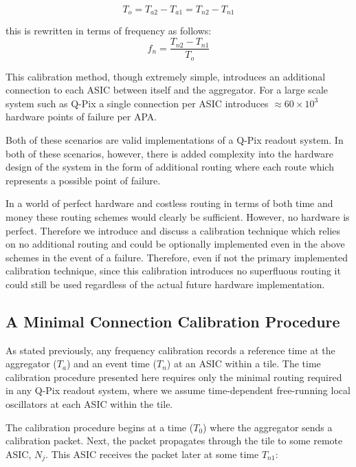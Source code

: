 \begin{equation}
  T_{o} = T_{a2} - T_{a1} = T_{n2} - T_{n1}
\end{equation}

this is rewritten in terms of frequency as follows:
\begin{equation}
  f_{n} = \frac{T_{n2} - T_{n1}}{T_{o}}
\end{equation}

This calibration method, though extremely simple, introduces an additional connection to each ASIC between itself and the aggregator.
For a large scale system such as Q-Pix a single connection per ASIC introduces $\approx 60\times 10^{3}$ hardware points of failure per APA.

Both of these scenarios are valid implementations of a Q-Pix readout system.
In both of these scenarios, however, there is added complexity into the hardware design of the system in the form of additional routing where each route which represents a possible point of failure.

In a world of perfect hardware and costless routing in terms of both time and money these routing schemes would clearly be sufficient.
However, no hardware is perfect.
Therefore we introduce and discuss a calibration technique which relies on no additional routing and could be optionally implemented even in the above schemes in the event of a failure.
Therefore, even if not the primary implemented calibration technique, since this calibration introduces no superfluous routing it could still be used regardless of the actual future hardware implementation.

\subsection{A Minimal Connection Calibration Procedure}\label{sec:min_calib}
As stated previously, any frequency calibration records a reference time at the aggregator ($T_{a}$) and an event time ($T_{n}$) at an ASIC within a tile.
The time calibration procedure presented here requires only the minimal routing required in any Q-Pix readout system, where we assume time-dependent free-running local oscillators at each ASIC within the tile.

The calibration procedure begins at a time ($T_{0}$) where the aggregator sends a calibration packet.
Next, the packet propagates through the tile to some remote ASIC, $N_{j}$.
This ASIC receives the packet later at some time $T_{n1}$:

